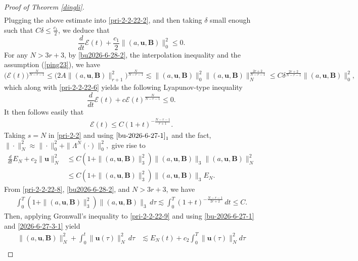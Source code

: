 \documentclass[12pt, reqno]{amsart}
\numberwithin{equation}{section}
\numberwithin{equation}{section}
\numberwithin{equation}{section}
\numberwithin{equation}{section}
\theoremstyle{remark}
\def\u{ \mathbf{u} }
\def\b{ \mathbf{B} }
\begin{document}
\begin{proof}[Proof of Theorem \ref{dingli}]
\begin{equation*}
\begin{split}
\end{split}\end{equation*}
Plugging the above estimate  into \eqref{pri-2-2-22-2}, and then taking $\delta$ small enough such that $C\delta\leq\frac{c_1}{2}$,  we  deduce that
\begin{equation}\label{pri-2-2-22-6}
\frac{d}{dt}{\mathcal{E}(t)}+\frac{c_1}{2}\|(a,\u,\b)\|_{0}^2\leq0.
\end{equation}
For any ${N}> 3r+3$, by \eqref{bu2026-6-28-2}, the interpolation inequality and the  assumption (\ref{ping23}),  we have
\begin{equation*}%
 \big(\mathcal{E}(t)\big)^{\frac{N}{N-r-1}}\leq \big(2A\|(a,\u,\b)\|^2_{r+1}\big)^{\frac{N}{N-r-1}}\lesssim\|(a,\u,\b)\|_{0}^{2}\|(a,\u,\b)\|_{N}^{\frac{2r+2}{N-r-1}}
\leq C\delta^{\frac{2r+2}{N-r-1}}\|(a,\u,\b)\|_{0}^{2},
\end{equation*}
which along with \eqref{pri-2-2-22-6} yields the following Lyapunov-type inequality
\begin{equation*}%
\frac{d}{dt}{\mathcal{E}(t)}+c\mathcal{E}(t)^{\frac{N}{N-r-1}}\leq0.
\end{equation*}
It then follows easily that
\begin{align}\label{pri-2-2-22-8}
{\mathcal{E}(t)}\le C(1+t)^{-\frac{N-r-1}{r+1}}.
\end{align}
Taking $s={N}$ in \eqref{pri-2-2} and using $\eqref{bu-2026-6-27-1}_1$ and the fact, $\|\cdot\|^2_{N}\approx\|\cdot\|^2_{0}+\|\Lambda^N(\cdot)\|^2_{0},$ give rise to
\begin{equation}\label{pri-2-2-22-9}
\begin{split}
\frac{d}{dt}E_{N}+c_2\|\u\|_{N}^2&\leq C(1+\|(a,\u,\b)\|^2_3)\|(a,\u,\b)\|_3\|(a,\u,\b)\|^2_{N}\\
&\leq C(1+\|(a,\u,\b)\|^2_3)\|(a,\u,\b)\|_3E_{N}.
\end{split}\end{equation}
From \eqref{pri-2-2-22-8}, \eqref{bu2026-6-28-2}, and $N>3r+3$, we have
\begin{align*}
\int_0^T(1+\|(a,\u,\b)\|^2_3)\|(a,\u,\b)\|_3\,d\tau\lesssim\int_0^T(1+t)^{-\frac{N-r-1}{2r+2}}\,dt\le C.
\end{align*}
Then, applying Gronwall's inequality to \eqref{pri-2-2-22-9} and using \eqref{bu-2026-6-27-1} and \eqref{2026-6-27-3-1} yield
\begin{equation}\begin{split}\label{bu-pri-2-2-22-10}
\big\|(a,\u,\b)\big\|^2_{N}+\int_0^t\|\u(\tau)\|_{N}^2\,d\tau&\lesssim E_{N}(t)+c_2\int_0^T\|\u(\tau)\|_{N}^2d\tau\\

\end{split}
\end{equation}
\end{proof}
\end{document}
